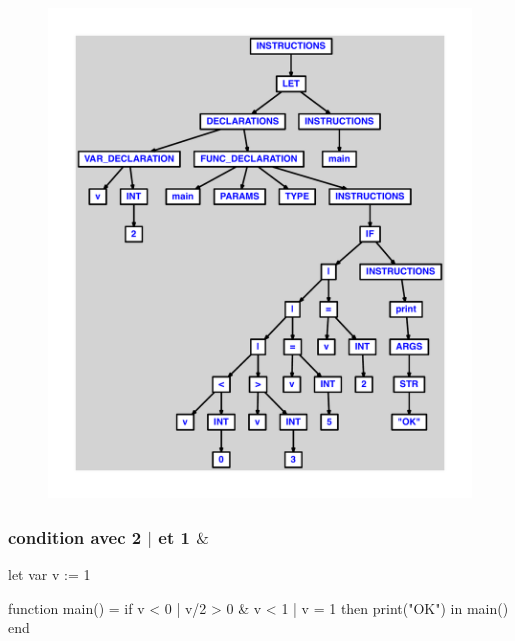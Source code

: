 \documentclass{article}
\begin{document}
\begin{figure}[H]\centering\includegraphics[max width=\textwidth]{ast/ast_275.pdf}\end{figure}\subsubsection{condition avec 2 $ | $ et 1 $ \& $}
\begin{verbatimtab}
let
	var v := 1

	function main() =
		if v < 0 | v/2 > 0 & v < 1 | v = 1 then print("OK")
in main() end
\end{verbatimtab}
\end{document}
